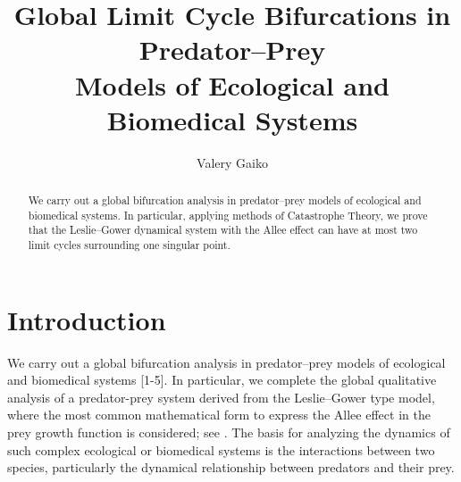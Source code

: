 \documentclass[12pt]{llncs}
\begin{document}
\fi

\title{Global Limit Cycle Bifurcations in Predator--Prey\\ Models of Ecological and Biomedical Systems}

\author{Valery Gaiko
}

\maketitle

\begin{abstract}
We carry out a global bifurcation analysis in predator--prey models of ecological and biomedical systems. In particular, applying methods of Catastrophe Theory, we prove that the Leslie--Gower
dynamical system with the Allee effect can have at most two limit cycles surrounding one singular
point.

\end{abstract}

\section{Introduction}

We carry out a global bifurcation analysis in predator--prey models of ecological and biomedical
systems [1-5]. In particular, we complete the global qualitative
analysis of a predator-prey system derived from the Leslie--Gower type model, where the most
common mathematical form to express the Allee effect in the prey growth function is considered;
see \cite{gaiko5}. The basis for analyzing the dynamics of such complex ecological or biomedical
systems is the interactions between two species, particularly the dynamical relationship between
predators and their prey. 
\end{document}
